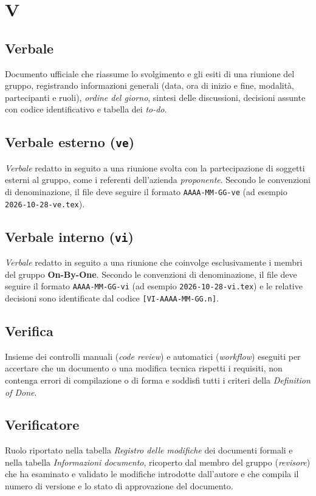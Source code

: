 \documentclass[11pt, a4paper]{article}
\begin{document}
\newpage

\section*{V}

\subsection*{Verbale}
Documento ufficiale che riassume lo svolgimento e gli esiti di una riunione del gruppo, registrando informazioni generali (data, ora di inizio e fine, modalità, partecipanti e ruoli), \textit{ordine del giorno}, sintesi delle discussioni, decisioni assunte con codice identificativo e tabella dei \textit{to-do}.

\subsection*{Verbale esterno (\texttt{ve})}
\textit{Verbale} redatto in seguito a una riunione svolta con la partecipazione di soggetti esterni al gruppo, come i referenti dell'azienda \textit{proponente}. Secondo le convenzioni di denominazione, il file deve seguire il formato \texttt{AAAA-MM-GG-ve} (ad esempio \texttt{2026-10-28-ve.tex}).

\subsection*{Verbale interno (\texttt{vi})}
\textit{Verbale} redatto in seguito a una riunione che coinvolge esclusivamente i membri del gruppo \textbf{On-By-One}. Secondo le convenzioni di denominazione, il file deve seguire il formato \texttt{AAAA-MM-GG-vi} (ad esempio \texttt{2026-10-28-vi.tex}) e le relative decisioni sono identificate dal codice \texttt{[VI-AAAA-MM-GG.n]}.

\subsection*{Verifica}
Insieme dei controlli manuali (\textit{code review}) e automatici (\textit{workflow}) eseguiti per accertare che un documento o una modifica tecnica rispetti i requisiti, non contenga errori di compilazione o di forma e soddisfi tutti i criteri della \textit{Definition of Done}.

\subsection*{Verificatore}
Ruolo riportato nella tabella \textit{Registro delle modifiche} dei documenti formali e nella tabella \textit{Informazioni documento}, ricoperto dal membro del gruppo (\textit{revisore}) che ha esaminato e validato le modifiche introdotte dall'autore e che compila il numero di versione e lo stato di approvazione del documento.
\end{document}
